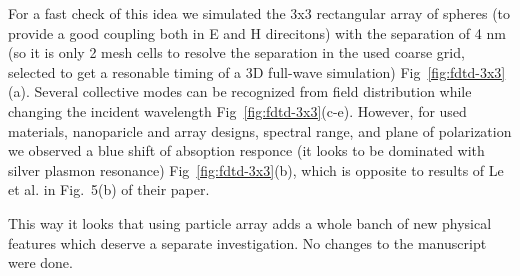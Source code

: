 \documentclass[a4paper]{article}
\begin{document}
For a fast check of this idea we simulated the 3x3 rectangular array
of spheres (to provide a good coupling both in E and H direcitons)
with the separation of 4 nm (so it is only 2 mesh cells to resolve the
separation in the used coarse grid, selected to get a resonable timing
of a 3D full-wave simulation) Fig~\ref{fig:fdtd-3x3}(a). Several
collective modes can be recognized from field distribution while
changing the incident wavelength Fig~\ref{fig:fdtd-3x3}(c-e). However,
for used materials, nanoparicle and array designs, spectral range, and
plane of polarization we observed a blue shift of absoption responce
(it looks to be dominated with silver plasmon resonance)
Fig~\ref{fig:fdtd-3x3}(b), which is opposite to results of Le et
al. in Fig.~5(b) of their paper.

This way it looks that using particle array adds a whole banch of new
physical features which deserve a separate investigation. No changes
to the manuscript were done.
\end{document}
